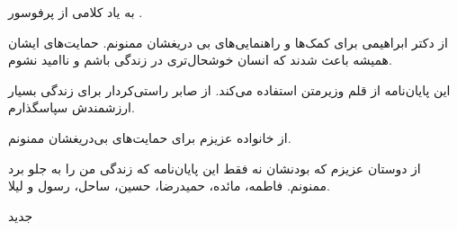 


\begin{center}
\end{center}

به یاد کلامی از پرفوسور
.

از دکتر ابراهیمی برای کمک‌ها و راهنمایی‌های بی دریغشان ممنونم. حمایت‌های ایشان همیشه باعث شدند که انسان خوشحال‌تری در زندگی باشم و ناامید نشوم.

این پایان‌نامه از قلم وزیرمتن استفاده می‌کند. از صابر راستی‌کردار برای زندگی بسیار ارزشمندش سپاسگذارم.

از خانواده عزیزم برای حمایت‌های بی‌دریغشان ممنونم.

از دوستان عزیزم که بودنشان نه فقط این پایان‌نامه که زندگی من را به جلو برد ممنونم. فاطمه، مائده، حمیدرضا، حسین، ساحل، رسول و لیلا.

‌جدید
